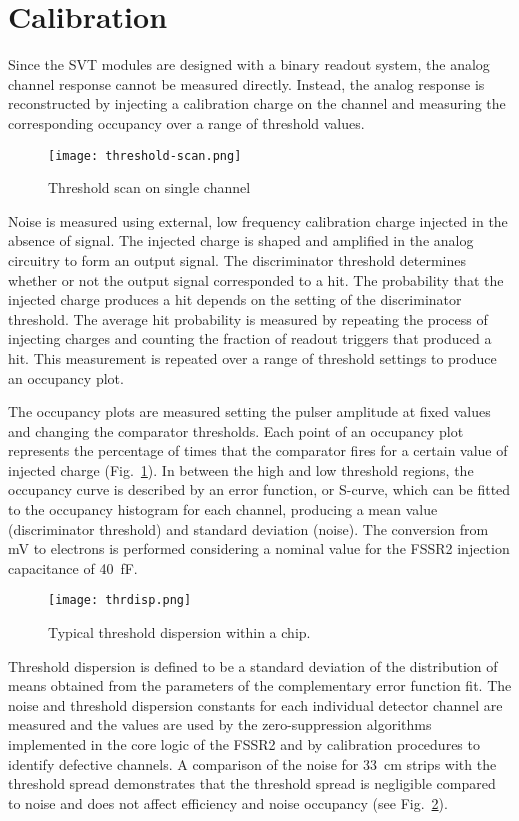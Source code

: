 \section{Calibration}

Since the SVT modules are designed with a binary readout system, the analog channel response cannot be measured directly. Instead, the analog response is reconstructed by injecting a calibration charge on the channel and measuring the corresponding occupancy over a range of threshold values. 

\begin{figure}[hbt] 
	\centering 
	\texttt{[image: threshold-scan.png]}
	\caption{Threshold scan on single channel}
	\label{fig:threshold-scan}
\end{figure}

Noise is measured using external, low frequency calibration charge injected in the absence of signal. The injected charge is shaped and amplified in the analog circuitry to form an output signal. The discriminator threshold determines whether or not the output signal corresponded to a hit. The probability that the injected charge produces a hit depends on the setting of the discriminator threshold. The average hit probability is measured by repeating the process of injecting charges and counting the fraction of readout triggers that produced a hit. This measurement is repeated over a range of threshold settings to produce an occupancy plot. 

The occupancy plots are measured setting the pulser amplitude at fixed values and changing the comparator thresholds. Each point of an occupancy plot represents the percentage of times that the comparator fires for a certain value of injected charge (Fig.~\ref{fig:threshold-scan}). In between the high and low threshold regions, the occupancy curve is described by an error function, or S-curve, which can be fitted to the occupancy histogram for each channel, producing a mean value (discriminator threshold) and standard deviation (noise). The conversion from mV to electrons is performed considering a nominal value for the FSSR2 injection capacitance of 40~fF. 

\begin{figure}[hbt] 
	\centering 
	\texttt{[image: thrdisp.png]}
	\caption{Typical threshold dispersion within a chip.}
	\label{fig:thrdisp}
\end{figure}

Threshold dispersion is defined to be a standard deviation of the distribution of means obtained from the parameters of the complementary error function fit. The noise and threshold dispersion constants for each individual detector channel are measured and the values are used by the zero-suppression algorithms implemented in the core logic of the FSSR2 and by calibration procedures to identify defective channels. A comparison of the noise for 33~cm strips with the threshold spread demonstrates that the threshold spread is negligible compared to noise and does not affect efficiency and noise occupancy (see Fig.~\ref{fig:thrdisp}).

